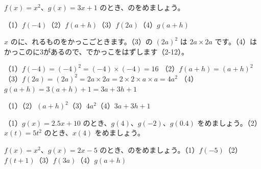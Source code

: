 \begin{reidai}[\R{式}{しき}をかっこごと\R{入}{い}れる]
$f(x)=x^2$、$g(x)=3x+1$ のとき、のをめましょう。\par
（1）$f(-4)$\quad（2）$f(a+h)$\quad（3）$f(2a)$\quad（4）$g(a+h)$\par
\kangaekata $x$ のに、れるものをかっこごときます。（3）の $(2a)^2$ は $2a\times2a$ です。（4）はかっこのに3があるので、でかっこをはずします（2-12）。\par
\bkthrdSi（1）\nobreak $f(-4)=(-4)^2=(-4)\times(-4)=16$
\bkthrdI（2）\nobreak $f(a+h)=(a+h)^2$
\bkthrdI（3）\nobreak $f(2a)=(2a)^2=2a\times2a=2\times2\times a\times a=4a^2$
\bkthrdI（4）\nobreak $g(a+h)=3(a+h)+1=3a+3h+1$\par
\bkthrdK（1）\quad（2）\nobreak $(a+h)^2$\quad（3）\nobreak $4a^2$\quad（4）\nobreak $3a+3h+1$
\end{reidai}

\begingroup{}%
\noindent\begin{minipage}[t]{0.49\linewidth}
\begin{jibun}
（1）$g(x)=2.5x+10$ のとき、$g(4)$、$g(-2)$、$g(0.4)$ をめましょう。（2）$x(t)=5t^2$ のとき、$x(4)$ をめましょう。
\end{jibun}
\end{minipage}\hfill
\begin{minipage}[t]{0.49\linewidth}
\begin{jibun}
$f(x)=x^2$、$g(x)=2x-5$ のとき、のをめましょう。（1）$f(-5)$\quad（2）$f(t+1)$\quad（3）$f(3a)$\quad（4）$g(a+h)$
\end{jibun}
\end{minipage}\par
\endgroup

